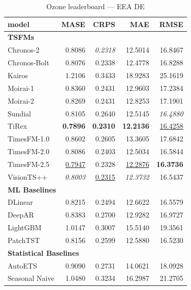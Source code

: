 \begin{table}[H]
\caption{Ozone leaderboard --- EEA DE}
\centering
\begin{small}
\begin{tabular}{lrrrr}
\toprule
model & MASE & CRPS & MAE & RMSE \\
\midrule
\multicolumn{5}{l}{\textbf{TSFMs}} \\
Chronos-2 & 0.8086 & \textit{0.2318} & 12.5014 & 16.8467 \\
Chronos-Bolt & 0.8076 & 0.2338 & 12.4778 & 16.8288 \\
Kairos & 1.2106 & 0.3433 & 18.9283 & 25.1619 \\
Moirai-1 & 0.8360 & 0.2431 & 12.9603 & 17.2384 \\
Moirai-2 & 0.8269 & 0.2431 & 12.8253 & 17.1901 \\
Sundial & 0.8105 & 0.2640 & 12.5145 & \textit{16.4880} \\
TiRex & \textbf{0.7896} & \textbf{0.2310} & \textbf{12.2136} & \underline{16.4258} \\
TimesFM-1.0 & 0.8602 & 0.2605 & 13.3605 & 17.6842 \\
TimesFM-2.0 & 0.8086 & 0.2403 & 12.5034 & 16.5844 \\
TimesFM-2.5 & \underline{0.7947} & 0.2328 & \underline{12.2876} & \textbf{16.3736} \\
VisionTS++ & \textit{0.8003} & \underline{0.2315} & \textit{12.3732} & 16.5437 \\
\midrule
\multicolumn{5}{l}{\textbf{ML Baselines}} \\
DLinear & 0.8215 & 0.2494 & 12.6622 & 16.5579 \\
DeepAR & 0.8383 & 0.2700 & 12.9282 & 16.9727 \\
LightGBM & 1.0147 & 0.3007 & 15.5140 & 19.3561 \\
PatchTST & 0.8156 & 0.2599 & 12.5880 & 16.5230 \\
\midrule
\multicolumn{5}{l}{\textbf{Statistical Baselines}} \\
AutoETS & 0.9090 & 0.2731 & 14.0621 & 18.0928 \\
Seasonal Naive & 1.0480 & 0.3234 & 16.2987 & 21.2705 \\
\bottomrule
\end{tabular}
\end{small}
\end{table}